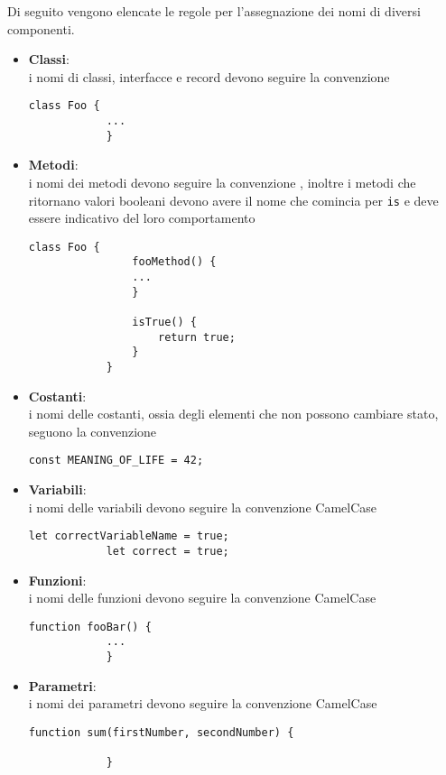 Di seguito vengono elencate le regole per l'assegnazione dei nomi di diversi componenti.
\begin{itemize}
	\item \textbf{Classi}:\\
		i nomi di classi, interfacce e record devono seguire la convenzione  \\
        \begin{lstlisting}[style=htmlcssjs]
			class Foo {
			...
			}
		\end{lstlisting}

    \item \textbf{Metodi}:\\
    	i nomi dei metodi devono seguire la convenzione , inoltre i metodi che ritornano valori booleani devono avere il
    	nome che comincia per \texttt{is} e deve essere indicativo del loro comportamento\\
		\begin{lstlisting}[style=htmlcssjs]
			class Foo {
				fooMethod() {
				...
				}

				isTrue() {
					return true;
				}
			}
		\end{lstlisting}

	\item \textbf{Costanti}:\\
		i nomi delle costanti, ossia degli elementi che non possono cambiare stato, seguono la convenzione
		 \\
		\begin{lstlisting}[style=htmlcssjs]
			const MEANING_OF_LIFE = 42;
		\end{lstlisting}

    \item \textbf{Variabili}:\\
		i nomi delle variabili devono seguire la convenzione CamelCase \\
		\begin{lstlisting}[style=htmlcssjs]
			let correctVariableName = true;
			let correct = true;
		\end{lstlisting}

	\item \textbf{Funzioni}:\\
		i nomi delle funzioni devono seguire la convenzione CamelCase \\

		\begin{lstlisting}[style=htmlcssjs]
			function fooBar() {
			...
			}
		\end{lstlisting}
	\item \textbf{Parametri}:\\
		i nomi dei parametri devono seguire la convenzione CamelCase \\

		\begin{lstlisting}[style=htmlcssjs]
			function sum(firstNumber, secondNumber) {

			}
		\end{lstlisting}

	\end{itemize}

